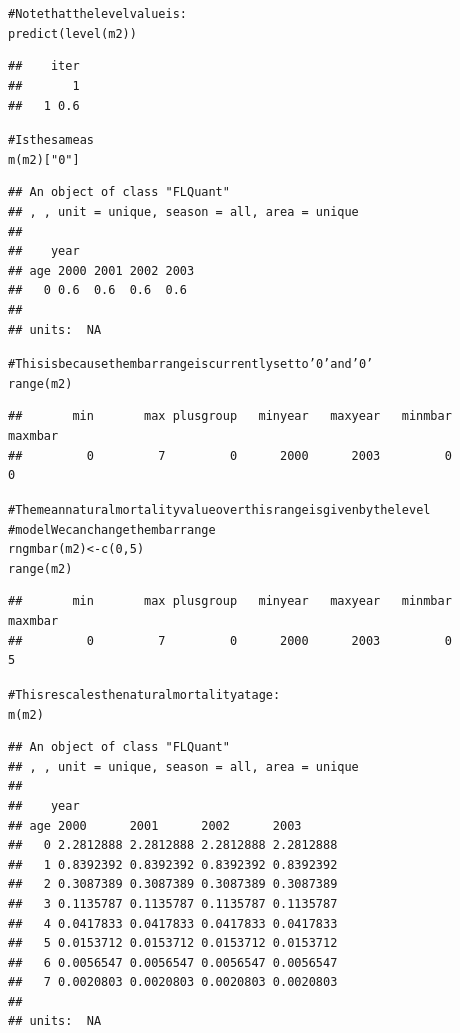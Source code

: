 \documentclass[a4paper,english,10pt]{article}\usepackage[]{graphicx}\usepackage[]{color}
\makeatletter
\newcommand{\hlnum}[1]{\textcolor[rgb]{0.2,0.2,0.2}{#1}}%
\newcommand{\hlstr}[1]{\textcolor[rgb]{0.2,0.2,0.2}{#1}}%
\newcommand{\hlcom}[1]{\textcolor[rgb]{0.2,0.267,0.4}{#1}}%
\newcommand{\hlstd}[1]{\textcolor[rgb]{0,0,0}{#1}}%
\newcommand{\hlkwb}[1]{\textcolor[rgb]{0.361,0.506,0.596}{#1}}%
\newcommand{\hlkwd}[1]{\textcolor[rgb]{0.361,0.506,0.596}{#1}}%
\newenvironment{kframe}{%
 \def\at@end@of@kframe{}%
 \ifinner\ifhmode%
  \def\at@end@of@kframe{\end{minipage}}%
  \begin{minipage}{\columnwidth}%
 \fi\fi%
 \def\FrameCommand##1{\hskip\@totalleftmargin \hskip-\fboxsep
 \colorbox{shadecolor}{##1}\hskip-\fboxsep
     \hskip-\linewidth \hskip-\@totalleftmargin \hskip\columnwidth}%
 \MakeFramed {\advance\hsize-\width
   \@totalleftmargin\z@ \linewidth\hsize
   \@setminipage}}%
 {\par\unskip\endMakeFramed%
 \at@end@of@kframe}
\newenvironment{knitrout}{}{} %
\makeatother
\begin{document}
\begin{knitrout}
\begin{kframe}
\begin{alltt}
\hlcom{# Note that the level value is:}
\hlkwd{predict}\hlstd{(}\hlkwd{level}\hlstd{(m2))}
\end{alltt}
\begin{verbatim}
##    iter
##       1
##   1 0.6
\end{verbatim}
\begin{alltt}
\hlcom{# Is the same as}
\hlkwd{m}\hlstd{(m2)[}\hlstr{"0"}\hlstd{]}
\end{alltt}
\begin{verbatim}
## An object of class "FLQuant"
## , , unit = unique, season = all, area = unique
## 
##    year
## age 2000 2001 2002 2003
##   0 0.6  0.6  0.6  0.6 
## 
## units:  NA
\end{verbatim}
\begin{alltt}
\hlcom{# This is because the mbar range is currently set to '0' and '0'}
\hlkwd{range}\hlstd{(m2)}
\end{alltt}
\begin{verbatim}
##       min       max plusgroup   minyear   maxyear   minmbar   maxmbar 
##         0         7         0      2000      2003         0         0
\end{verbatim}
\begin{alltt}
\hlcom{# The mean natural mortality value over this range is given by the level}
\hlcom{# model We can change the mbar range}
\hlkwd{rngmbar}\hlstd{(m2)} \hlkwb{<-} \hlkwd{c}\hlstd{(}\hlnum{0}\hlstd{,} \hlnum{5}\hlstd{)}
\hlkwd{range}\hlstd{(m2)}
\end{alltt}
\begin{verbatim}
##       min       max plusgroup   minyear   maxyear   minmbar   maxmbar 
##         0         7         0      2000      2003         0         5
\end{verbatim}
\begin{alltt}
\hlcom{# This rescales the natural mortality at age:}
\hlkwd{m}\hlstd{(m2)}
\end{alltt}
\begin{verbatim}
## An object of class "FLQuant"
## , , unit = unique, season = all, area = unique
## 
##    year
## age 2000      2001      2002      2003     
##   0 2.2812888 2.2812888 2.2812888 2.2812888
##   1 0.8392392 0.8392392 0.8392392 0.8392392
##   2 0.3087389 0.3087389 0.3087389 0.3087389
##   3 0.1135787 0.1135787 0.1135787 0.1135787
##   4 0.0417833 0.0417833 0.0417833 0.0417833
##   5 0.0153712 0.0153712 0.0153712 0.0153712
##   6 0.0056547 0.0056547 0.0056547 0.0056547
##   7 0.0020803 0.0020803 0.0020803 0.0020803
## 
## units:  NA
\end{verbatim}

\end{kframe}
\end{knitrout}
\end{document}
